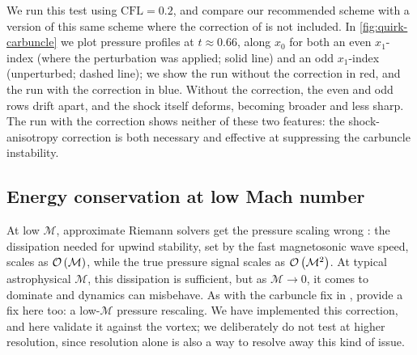 We run this test using $\mathrm{CFL} = 0.2$, and compare our recommended scheme with a version of this same scheme where the correction of \citet{Minoshima21a} is not included. In \cref{fig:quirk-carbuncle} we plot pressure profiles at $t \approx 0.66$, along $x_0$ for both an even $x_1$-index (where the perturbation was applied; solid line) and an odd $x_1$-index (unperturbed; dashed line); we show the run without the correction in red, and the run with the correction in blue. Without the correction, the even and odd rows drift apart, and the shock itself deforms, becoming broader and less sharp. The run with the correction shows neither of these two features: the \citet{Minoshima21a} shock-anisotropy correction is both necessary and effective at suppressing the carbuncle instability.

\subsection{Energy conservation at low Mach number}
\label{sec:stress-tests:balsara-vortex}

At low $\mathcal{M}$, approximate Riemann solvers get the pressure scaling wrong \citep{GuillardMurrone04a, watt2025mitigating}: the dissipation needed for upwind stability, set by the fast magnetosonic wave speed, scales as $\mathcal{O}\left( \mathcal{M} \right)$, while the true pressure signal scales as $\mathcal{O}\left( \mathcal{M}^2 \right)$. At typical astrophysical $\mathcal{M}$, this dissipation is sufficient, but as $\mathcal{M} \to 0$, it comes to dominate and dynamics can misbehave. As with the carbuncle fix in , \citet{Minoshima21a} provide a fix here too: a low-$\mathcal{M}$ pressure rescaling. We have implemented this correction, and here validate it against the \citet{Balsara04a} vortex; we deliberately do not test at higher resolution, since resolution alone is also a way to resolve away this kind of issue.


